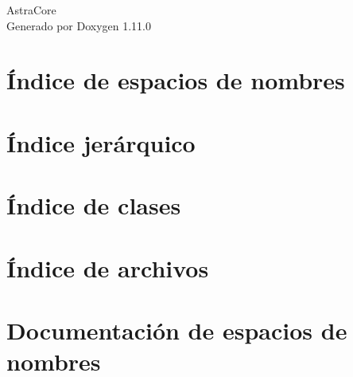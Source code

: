 \documentclass[twoside]{book}
\newcommand{\+}{\discretionary{\mbox{\scriptsize$\hookleftarrow$}}{}{}}
\newcommand{\clearemptydoublepage}{%
    \newpage{\pagestyle{empty}\cleardoublepage}%
  }
\begin{document}
  \raggedbottom
    \hypersetup{pageanchor=false,
                bookmarksnumbered=true,
                pdfencoding=unicode
               }
  \begin{titlepage}
  \vspace*{7cm}
  \begin{center}%
  {\Large Astra\+Core}\\
  \vspace*{1cm}
  {\large Generado por Doxygen 1.11.0}\\
  \end{center}
  \end{titlepage}
  \clearemptydoublepage
  \tableofcontents
  \clearemptydoublepage
  \hypersetup{pageanchor=true}
\chapter{Índice de espacios de nombres}

\chapter{Índice jerárquico}

\chapter{Índice de clases}

\chapter{Índice de archivos}

\chapter{Documentación de espacios de nombres}

\end{document}
